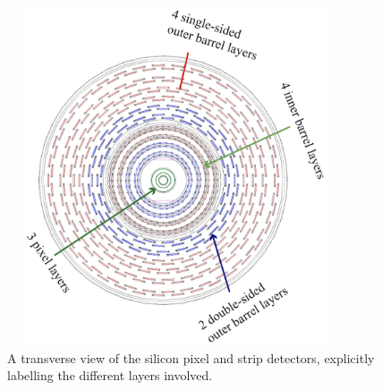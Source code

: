 \begin{figure}[h]
\centering
\includegraphics[width=10cm,height=10cm,keepaspectratio]{figures/cms/tracker/silicon_tracker_transverse_view.png}
    \caption{A transverse view of the silicon pixel and strip detectors, explicitly labelling the different layers involved.}
    \label{fig:tracker_xs}
\end{figure}


